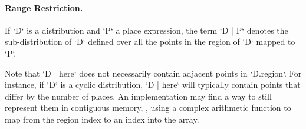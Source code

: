 \paragraph{Range Restriction.}

If \xcd`D` is a distribution and \xcd`P` a place expression, the term
\xcd`D | P` 
denotes the sub-distribution of \xcd`D` defined over all the
points in the region of \xcd`D` mapped to \xcd`P`.

Note that \xcd`D | here` does not necessarily contain adjacent points
in \xcd`D.region`. For instance, if \xcd`D` is a cyclic distribution,
\xcd`D | here` will typically contain points that differ by the number of
places. 
An implementation may find a
way to still represent them in contiguous memory, \eg, using a
complex arithmetic function to map from the region index to an index
into the array.




